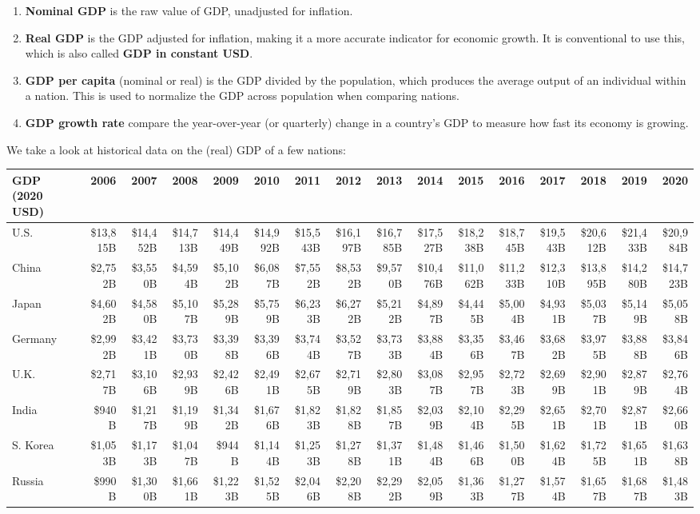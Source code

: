 \documentclass{article}
\begin{document}
    \begin{enumerate}
      \item \textbf{Nominal GDP} is the raw value of GDP, unadjusted for inflation.
      \item \textbf{Real GDP} is the GDP adjusted for inflation, making it a more accurate indicator for economic growth. It is conventional to use this, which is also called \textbf{GDP in constant USD}.
      \item \textbf{GDP per capita} (nominal or real) is the GDP divided by the population, which produces the average output of an individual within a nation. This is used to normalize the GDP across population when comparing nations.
      \item \textbf{GDP growth rate} compare the year-over-year (or quarterly) change in a country's GDP to measure how fast its economy is growing.
    \end{enumerate}

    We take a look at historical data on the (real) GDP of a few nations:

    \begin{table}[H]
      \begin{tabular}{lrrrrrrrrrrrrrrr}
      \hline
      GDP (2020 USD) & 2006 & 2007 & 2008 & 2009 & 2010 & 2011 & 2012 & 2013 & 2014 & 2015 & 2016 & 2017 & 2018 & 2019 & 2020 \\
      \hline
      U.S. & \$13,815B & \$14,452B & \$14,713B & \$14,449B & \$14,992B & \$15,543B & \$16,197B & \$16,785B & \$17,527B & \$18,238B & \$18,745B & \$19,543B & \$20,612B & \$21,433B & \$20,984B \\
      China & \$2,752B & \$3,550B & \$4,594B & \$5,102B & \$6,087B & \$7,552B & \$8,532B & \$9,570B & \$10,476B & \$11,062B & \$11,233B & \$12,310B & \$13,895B & \$14,280B & \$14,723B \\
      Japan & \$4,602B & \$4,580B & \$5,107B & \$5,289B & \$5,759B & \$6,233B & \$6,272B & \$5,212B & \$4,897B & \$4,445B & \$5,004B & \$4,931B & \$5,037B & \$5,149B & \$5,058B \\
      Germany & \$2,992B & \$3,421B & \$3,730B & \$3,398B & \$3,396B & \$3,744B & \$3,527B & \$3,733B & \$3,884B & \$3,356B & \$3,467B & \$3,682B & \$3,975B & \$3,888B & \$3,846B \\
      U.K. & \$2,717B & \$3,106B & \$2,939B & \$2,426B & \$2,491B & \$2,675B & \$2,719B & \$2,803B & \$3,087B & \$2,957B & \$2,723B & \$2,699B & \$2,901B & \$2,879B & \$2,764B \\
      India & \$940B & \$1,217B & \$1,199B & \$1,342B & \$1,676B & \$1,823B & \$1,828B & \$1,857B & \$2,039B & \$2,104B & \$2,295B & \$2,651B & \$2,701B & \$2,871B & \$2,660B \\
      S. Korea & \$1,053B & \$1,173B & \$1,047B & \$944B & \$1,144B & \$1,253B & \$1,278B & \$1,371B & \$1,484B & \$1,466B & \$1,500B & \$1,624B & \$1,725B & \$1,651B & \$1,638B \\
      Russia & \$990B & \$1,300B & \$1,661B & \$1,223B & \$1,525B & \$2,046B & \$2,208B & \$2,292B & \$2,059B & \$1,363B & \$1,277B & \$1,574B & \$1,657B & \$1,687B & \$1,483B \\
      \hline 
      \end{tabular}
    \end{table}
\end{document}
